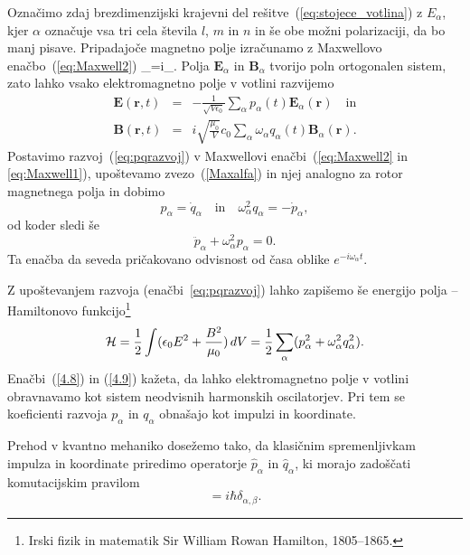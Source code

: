 Označimo zdaj brezdimenzijski krajevni del rešitve~(\ref{eq:stojece_votlina}) z 
$E_{\alpha}$, kjer $\alpha$
označuje vsa tri cela števila $l$, $m$ in $n$ in še obe možni polarizaciji, da bo manj pisave. 
Pripadajoče magnetno polje izračunamo z Maxwellovo enačbo~(\ref{eq:Maxwell2}) 
\beq
\nabla\times{}_{\alpha}=i\omega{}_{\alpha}.
\label{Maxalfa}
\eeq
Polja $\mathbf{E}_{\alpha}$ in $\mathbf{B}_{\alpha}$ tvorijo poln ortogonalen
sistem, zato lahko vsako elektromagnetno polje v votlini razvijemo
\begin{eqnarray}
\mathbf{E}(\mathbf{r},t) & = & -\frac{1}{\sqrt{V\epsilon_{0}}}
\sum_{\alpha}p_{\alpha}(t)\mathbf{E}_{\alpha}(\mathbf{r}) \quad \mathrm{in}\nonumber \\
\mathbf{B}(\mathbf{r},t) & = & i\sqrt{\frac{\mu_{0}}{V}}c_0\sum_{\alpha}
\omega_{\alpha}q_{\alpha}(t)\mathbf{B}_{\alpha}(\mathbf{r}).
\label{eq:pqrazvoj}
\end{eqnarray}
Postavimo razvoj~(\ref{eq:pqrazvoj}) v Maxwellovi enačbi~(\ref{eq:Maxwell2}
in \ref{eq:Maxwell1}), upoštevamo zvezo~(\ref{Maxalfa}) in njej analogno za rotor magnetnega polja
in dobimo 
\begin{equation}
p_{\alpha}=\dot{q}_{\alpha} \quad \mathrm{in} \quad 
\omega_{\alpha}^{2}q_{\alpha}=-\dot{p}_{\alpha},
\label{4.7}
\end{equation}
od koder sledi še 
\begin{equation}
\ddot{p}_{\alpha}+\omega_{\alpha}^{2}p_{\alpha}=0.
\label{4.8}
\end{equation}
Ta enačba da seveda pričakovano odvisnost od časa oblike $e^{-i \omega_\alpha t}$.


Z upoštevanjem razvoja (enačbi~\ref{eq:pqrazvoj}) lahko zapišemo še energijo 
polja -- Hamiltonovo 
funkcijo\footnote{Irski fizik in matematik Sir William Rowan Hamilton, 1805--1865.}
\begin{equation}
{\cal H}=\frac{1}{2}\int(\epsilon_{0}E^{2}+\frac{B^{2}}{\mu_0})\, 
dV=\frac{1}{2}\sum_{\alpha}(p_{\alpha}^{2}+\omega_{\alpha}^{2}q_{\alpha}^{2}).
\label{4.9}
\end{equation}
Enačbi~(\ref{4.8}) in (\ref{4.9}) kažeta, da lahko elektromagnetno polje v votlini
obravnavamo kot sistem neodvisnih harmonskih oscilatorjev. 
Pri tem se koeficienti razvoja $p_{\alpha}$ in $q_{\alpha}$ obnašajo kot
impulzi in koordinate. 


Prehod v kvantno mehaniko dosežemo tako, da klasičnim spremenljivkam impulza in koordinate
priredimo operatorje $\hat{p}_{\alpha}$ in $\hat{q}_{\alpha}$,
ki morajo zadoščati komutacijskim pravilom 
\begin{equation}
[\hat{q}_{\alpha},\hat{p}_{\beta}]=i\hbar \delta_{\alpha, \beta}.
\label{4.10}
\end{equation}


